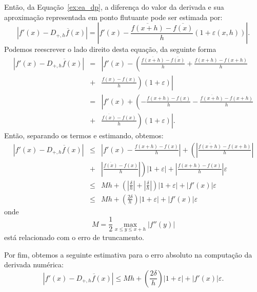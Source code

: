 Então, da Equação~\eqref{ex:ea_dp}, a diferença do valor da derivada e sua aproximação representada em ponto flutuante pode ser estimada por:
\begin{equation}
\left|f'(x)-\overline{D_{+,h}f(x)}\right| = \left| f'(x)-\frac{\overline{f(x+h)}-\overline{f(x)}}{h}(1+\varepsilon(x,h)) \right|.
\end{equation}
Podemos reescrever o lado direito desta equação, da seguinte forma
\begin{eqnarray}
  \left|f'(x)-\overline{D_{+,h}f(x)}\right| &=& \left| f'(x)-\left(\frac{\overline{f(x+h)}-\overline{f(x)}}{h}+\frac{f(x+h)-f(x+h)}{h}\right.\right. \\
                                            &+& \left.\left.\frac{f(x)-f(x)}{h}\right)(1+\varepsilon) \right|\\
                                            &=& \left| f'(x)+\left(-\frac{f(x+h)-f(x)}{h}-\frac{\overline{f(x+h)}-f(x+h)}{h}\right.\right.\\
                                            &+& \left.\left. \frac{\overline{f(x)}-f(x)}{h}\right)(1+\varepsilon) \right|.
\end{eqnarray}
Então, separando os termos e estimando, obtemos:
\begin{eqnarray}
\left|f'(x)-\overline{D_{+,h}f(x)}\right| &\leq& \left|f'(x)-\frac{f(x+h)-f(x)}{h}\right| +\left(\left|\frac{\overline{f(x+h)}-f(x+h)}{h}\right|\right.\\
&+&\left.\left|\frac{\overline{f(x)}-f(x)}{h}\right| \right)|1+\varepsilon| + \left|\frac{f(x+h)-f(x)}{h}\right|\varepsilon\\
&\leq& Mh +\left(\left|\frac{\delta}{h}\right|+\left|\frac{\delta}{h}\right| \right)|1+\varepsilon| +|f'(x)|\varepsilon\\
&\leq& Mh +\left(\frac{2\delta}{h}\right)|1+\varepsilon| +|f'(x)|\varepsilon
\end{eqnarray}
onde
\begin{equation}
M=\frac{1}{2}\max_{x\leq y\leq x+h}|f''(y)|
\end{equation}
está relacionado com o erro de truncamento.

Por fim, obtemos a seguinte estimativa para o erro absoluto na computação da derivada numérica:
\begin{equation}\label{eq:est_erro_arredondamento}
  \left|f'(x)-\overline{D_{+,h}f(x)}\right| \leq Mh +\left(\frac{2\delta}{h}\right)|1+\varepsilon| +|f'(x)|\varepsilon.
\end{equation}

